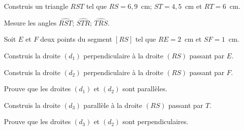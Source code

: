 \begin{myenumerate}
\item Construis un triangle $RST$ tel que $RS=6,9$~cm; $ST=4,5$~cm et
$RT=6$~cm.
\item Mesure les angles $\widehat{RST}$; $\widehat{STR}$;
$\widehat{TRS}$.
\item Soit $E$ et $F$ deux points du segment $[RS]$ tel que $RE=2$~cm
et $SF=1$~cm.
\item Construis la droite $(d_1)$ perpendiculaire à la droite $(RS)$
passant par $E$.
\item Construis la droite $(d_2)$ perpendiculaire à la droite $(RS)$
passant par $F$.
\item Prouve que les droites $(d_1)$ et $(d_2)$ sont parallèles.
\item Construis la droite $(d_3)$ parallèle à la droite $(RS)$ passant
par $T$.
\item Prouve que les droites $(d_3)$ et $(d_2)$ sont perpendiculaires.
\end{myenumerate}